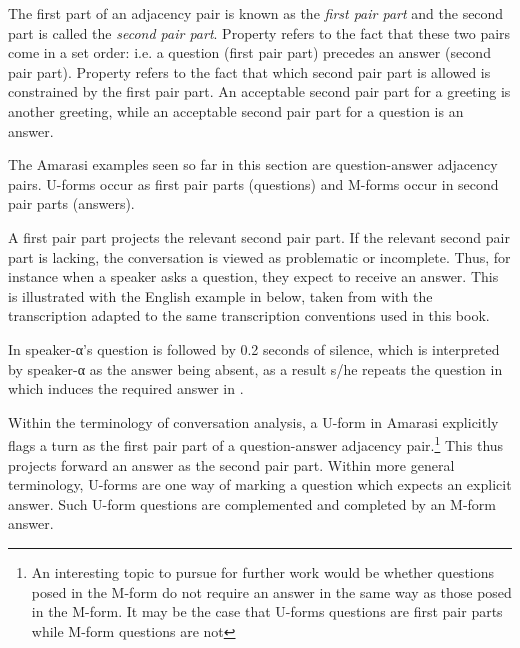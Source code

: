 The first part of an adjacency pair
is known as the \emph{first pair part}
and the second part is called the \emph{second pair part}.
Property  refers to the fact
that these two pairs come in a set order:
i.e. a question (first pair part) precedes an answer (second pair part).
Property  refers to
the fact that which second pair part is allowed
is constrained by the first pair part.
An acceptable second pair part for a greeting
is another greeting, while an acceptable
second pair part for a question is an answer.

The Amarasi examples seen so far in this section
are question-answer adjacency pairs.
U-forms occur as first pair parts (questions)
and M-forms occur in second pair parts (answers).

A first pair part projects the relevant second pair part.
If the relevant second pair part is lacking,
the conversation is viewed as problematic or incomplete.
Thus, for instance when a speaker asks a question,
they expect to receive an answer.
This is illustrated with the English example in  below,
taken from \cite{li07} with the transcription adapted to the same
transcription conventions used in this book.

\begin{exe}
	\label{ex:ACon}
	\begin{xlist}
		\label{ex:ACon-1}
		\label{ex:ACon-2}
		\label{ex:ACon-3}
		\label{ex:ACon-4}
	\end{xlist}
\end{exe}

In  speaker-α's question is followed by 0.2 seconds of silence,
which is interpreted by speaker-α as the answer being absent,
as a result s/he repeats the question in 
which induces the required answer in .

Within the terminology of conversation analysis,
a U-form in Amarasi explicitly flags a turn as
the first pair part of a question-answer adjacency pair.\footnote{
		An interesting topic to pursue for further work
		would be whether questions posed in the M-form
		do not require an answer in the same way as those posed in the M-form.
		It may be the case that U-forms questions are first pair parts
		while M-form questions are not}
This thus projects forward an answer as the second pair part.
Within more general terminology,
U-forms are one way of marking a question
which expects an explicit answer.
Such U-form questions are complemented and completed by an M-form answer.

